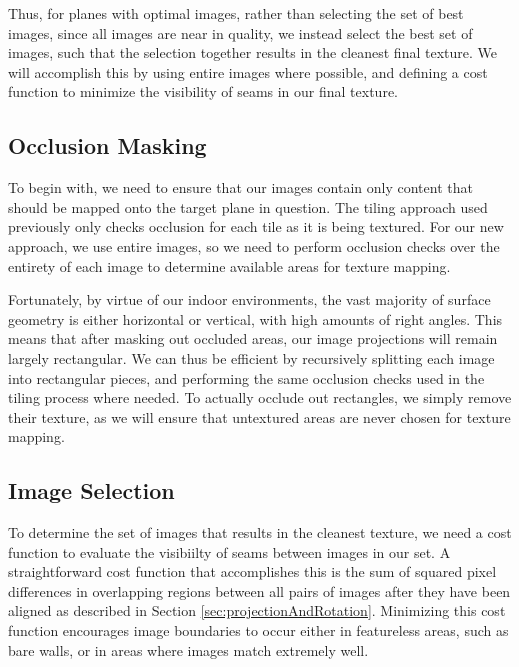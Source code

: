 \documentclass[10pt,twocolumn,letterpaper]{article}
\begin{document}
Thus, for planes with optimal images, rather than selecting the set of
best images, since all images are near in quality, we instead select
the best set of images, such that the selection together results in
the cleanest final texture. We will accomplish this by using entire
images where possible, and defining a cost function to minimize the
visibility of seams in our final texture.

\subsection{Occlusion Masking}
\label{sec:occlusionMasking}
To begin with, we need to ensure that our images contain only content
that should be mapped onto the target plane in question. The tiling
approach used previously only checks occlusion for each tile as it is
being textured. For our new approach, we use entire images, so we need
to perform occlusion checks over the entirety of each image to
determine available areas for texture mapping.

Fortunately, by virtue of our indoor environments, the vast majority
of surface geometry is either horizontal or vertical, with high
amounts of right angles. This means that after masking out occluded
areas, our image projections will remain largely rectangular. We can
thus be efficient by recursively splitting each image into rectangular
pieces, and performing the same occlusion checks used in the tiling
process where needed. To actually occlude out rectangles, we simply
remove their texture, as we will ensure that untextured areas are
never chosen for texture mapping.

\subsection{Image Selection}
\label{sec:imageSelection}
To determine the set of images that results in the cleanest texture,
we need a cost function to evaluate the visibiilty of seams between
images in our set. A straightforward cost function that accomplishes
this is the sum of squared pixel differences in overlapping regions
between all pairs of images after they have been aligned as described
in Section \ref{sec:projectionAndRotation}. Minimizing this cost
function encourages image boundaries to occur either in featureless
areas, such as bare walls, or in areas where images match extremely
well.
\end{document}

